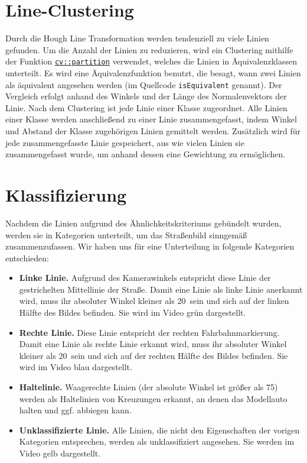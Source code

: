 \documentclass[a4paper,12pt]{report}
\begin{document}
\section{Line-Clustering}
	Durch die Hough Line Transformation werden tendenziell zu viele Linien gefunden.
	Um die Anzahl der Linien zu reduzieren, wird ein Clustering mithilfe der Funktion \href{https://docs.opencv.org/3.4.0/d5/d38/group\_\_core\_\_cluster.html\#ga2037c989e69b499c1aa271419f3a9b34}{\texttt{cv::partition}} \cite{opencv-doc} verwendet, welches die Linien in Äquivalenzklassen unterteilt.
	Es wird eine Äquivalenzfunktion benutzt, die besagt, wann zwei Linien als äquivalent angesehen werden (im Quellcode \texttt{isEquivalent} genannt).
	Der Vergleich erfolgt anhand des Winkels und der Länge des Normalenvektors der Linie.
	Nach dem Clustering ist jede Linie einer Klasse zugeordnet.
	Alle Linien einer Klasse werden anschließend zu einer Linie zusammengefasst, indem Winkel und Abstand der Klasse zugehörigen Linien gemittelt werden.
	Zusätzlich wird für jede zusammengefasste Linie gespeichert, aus wie vielen Linien sie zusammengefasst wurde, um anhand dessen eine Gewichtung zu ermöglichen.

\section{Klassifizierung}
	Nachdem die Linien aufgrund des Ähnlichkeitskriteriums gebündelt wurden, werden sie in Kategorien unterteilt, um das Straßenbild sinngemäß zusammenzufassen.
	Wir haben uns für eine Unterteilung in folgende Kategorien entschieden: %
	\begin{itemize}
		\item \textbf{Linke Linie.} Aufgrund des Kamerawinkels entspricht diese Linie der gestrichelten Mittellinie der Straße.
		Damit eine Linie als linke Linie anerkannt wird, muss ihr absoluter Winkel kleiner als 20\degree\ sein und sich auf der linken Hälfte des Bildes befinden. Sie wird im Video grün dargestellt.
		\item \textbf{Rechte Linie.} Diese Linie entspricht der rechten Fahrbahnmarkierung.
		Damit eine Linie als rechte Linie erkannt wird, muss ihr absoluter Winkel kleiner als 20\degree\ sein und sich auf der rechten Hälfte des Bildes befinden. Sie wird im Video blau dargestellt.
		\item \textbf{Haltelinie.} Waagerechte Linien (der absolute Winkel ist größer als 75\degree) werden als Haltelinien von Kreuzungen erkannt, an denen das Modellauto halten und ggf. abbiegen kann.
		\item \textbf{Unklassifizierte Linie.} Alle Linien, die nicht den Eigenschaften der vorigen Kategorien entsprechen, werden als unklassifiziert angesehen. Sie werden im Video gelb dargestellt.
	\end{itemize}
\end{document}
